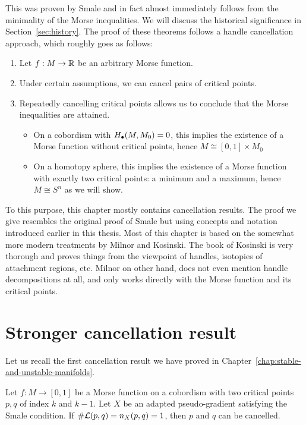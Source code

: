 This was proven by Smale and in fact almost immediately follows from the minimality of the Morse inequalities.
We will discuss the historical significance in Section~\ref{sec:history}.
The proof of these theorems follows a handle cancellation approach, which roughly goes as follows:
\begin{enumerate}[(1)]
    \item Let $f: M \to  \mathbb{R}$ be an arbitrary Morse function.
    \item Under certain assumptions, we can cancel pairs of critical points.
    \item Repeatedly cancelling critical points allows us to conclude that the Morse inequalities are attained.
        \begin{itemize}
            \item On a cobordism with $H_\bullet(M, M_0) = 0$, this implies the existence of a Morse function without critical points, hence $M \cong [0,1] \times M_0$
            \item On a homotopy sphere, this implies the existence of a Morse function with exactly two critical points: a minimum and a maximum,  hence $M \cong S^{n}$ as we will show.
        \end{itemize}
\end{enumerate}

To this purpose, this chapter mostly contains cancellation results.
The proof we give resembles the original proof of Smale but using concepts and notation introduced earlier in this thesis.
Most of this chapter is based on the somewhat more modern treatments by Milnor and Kosinski.
The book of Kosinski is very thorough and proves things from the viewpoint of handles, isotopies of attachment regions, etc.
Milnor on other hand, does not even mention handle decompositions at all, and only works directly with the Morse function and its critical points.




\section{Stronger cancellation result}
Let us recall the first cancellation result we have proved in Chapter~\ref{chap:stable-and-unstable-manifolds}.

\begingroup
\def\thetheorem{\ref{firstcancellation}}
\begin{theorem}
    Let $f: M \to  [0,1]$ be a Morse function on a cobordism with two critical points $p, q$ of index $k$ and  $k-1$. Let $X$ be an adapted pseudo-gradient satisfying the Smale condition.
    If $\# \mathcal L(p, q)  = n_{X}(p, q) = 1$, then $p$ and  $q$ can be cancelled.
\end{theorem}
\addtocounter{theorem}{-1}
\endgroup

